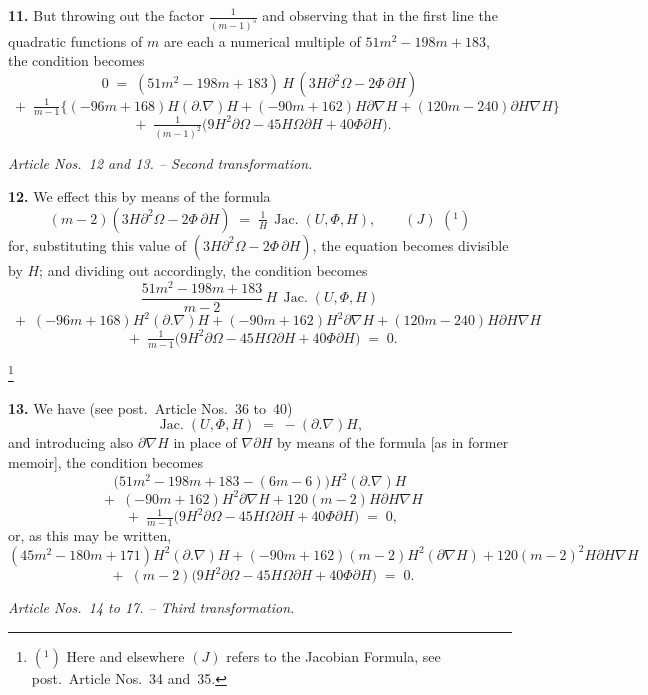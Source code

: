 \documentclass[11pt,a4paper]{article}
\providecommand{\Jac}{\operatorname{Jac.}}
\begin{document}
\medskip

\textbf{11.} But throwing out the factor $\tfrac{1}{(m-1)^5}$ and observing that in the first line the quadratic functions of $m$ are each a numerical multiple of $51m^2 - 198m + 183$, the condition becomes
\[
0 \;=\; (51m^2 - 198m + 183)\,H\,(3H\partial^2\Omega - 2\Phi\,\partial H)
\]
\[
\;+\; \tfrac{1}{m-1}\bigl\{(-96m+168)H(\partial.\nabla)H + (-90m+162)H\partial\nabla H + (120m-240)\partial H\nabla H\bigr\}
\]
\[
\;+\; \tfrac{1}{(m-1)^2}\bigl(9H^2\partial\Omega - 45H\Omega\partial H + 40\Phi\partial H\bigr).
\]

\bigskip

\begin{center}
\textit{Article Nos.\ 12 and 13. -- Second transformation.}
\end{center}

\textbf{12.} We effect this by means of the formula
\[
(m-2)(3H\partial^2\Omega - 2\Phi\,\partial H) \;=\; \tfrac{1}{H}\,\Jac(U,\Phi,H), \qquad (J)\,\,(^{1})
\]
for, substituting this value of $(3H\partial^2\Omega - 2\Phi\,\partial H)$, the equation becomes divisible by $H$; and dividing out accordingly, the condition becomes
\[
\frac{51m^2-198m+183}{m-2}\,H\,\Jac(U,\Phi,H)
\]
\[
\;+\;(-96m+168)H^2(\partial.\nabla)H + (-90m+162)H^2\partial\nabla H + (120m-240)H\partial H\nabla H
\]
\[
\;+\;\tfrac{1}{m-1}\bigl(9H^2\partial\Omega - 45H\Omega\partial H + 40\Phi\partial H\bigr) \;=\; 0.
\]

\footnote{$(^1)$ Here and elsewhere $(J)$ refers to the Jacobian Formula, see post.\ Article Nos.~34 and~35.}

\medskip

\textbf{13.} We have (see post.\ Article Nos.~36 to~40)
\[
\Jac(U,\Phi,H) \;=\; -(\partial.\nabla)H,
\]
and introducing also $\partial\nabla H$ in place of $\nabla\partial H$ by means of the formula
[as in former memoir], the condition becomes
\[
\bigl(51m^2 - 198m + 183 - (6m-6)\bigr)H^2(\partial.\nabla)H
\]
\[
\;+\; (-90m+162)H^2\partial\nabla H + 120(m-2)H\partial H\nabla H
\]
\[
\;+\; \tfrac{1}{m-1}\bigl(9H^2\partial\Omega - 45H\Omega\partial H + 40\Phi\partial H\bigr) \;=\; 0,
\]
or, as this may be written,
\[
(45m^2-180m+171)H^2(\partial.\nabla)H + (-90m+162)(m-2)H^2(\partial\nabla H) + 120(m-2)^2H\partial H\nabla H
\]
\[
\;+\; (m-2)\bigl(9H^2\partial\Omega - 45H\Omega\partial H + 40\Phi\partial H\bigr) \;=\; 0.
\]

\bigskip

\begin{center}
\textit{Article Nos.\ 14 to 17. -- Third transformation.}
\end{center}
\end{document}
